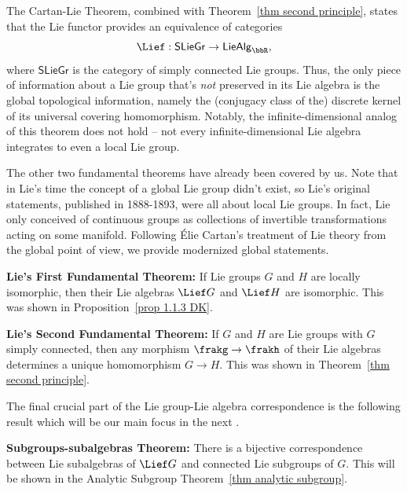 \begin{rem}
    The Cartan-Lie Theorem, combined with Theorem~\ref{thm second principle}, states that the Lie functor provides an equivalence of categories
    \[\Lief:\mathsf{SLieGr}\to \mathsf{LieAlg}_\bbR,\]
    where $\mathsf{SLieGr}$ is the category of simply connected Lie groups. Thus, the only piece of information about a Lie group that's \emph{not} preserved in its Lie algebra is the global topological information, namely the (conjugacy class of the) discrete kernel of its universal covering homomorphism. Notably, the infinite-dimensional analog of this theorem does not hold -- not every infinite-dimensional Lie algebra integrates to even a local Lie group.

    The other two fundamental theorems have already been covered by us. Note that in Lie's time the concept of a global Lie group didn't exist, so Lie's original statements, published in 1888-1893, were all about local Lie groups. In fact, Lie only conceived of continuous groups as collections of invertible transformations acting on some manifold. Following \'Elie Cartan's treatment of Lie theory from the global point of view, we provide modernized global statements.

    \textbf{Lie's First Fundamental Theorem:} If Lie groups $G$ and $H$ are locally isomorphic, then their Lie algebras $\Lief G$ and $\Lief H$ are isomorphic. This was shown in Proposition~\ref{prop 1.1.3 DK}.

    \textbf{Lie's Second Fundamental Theorem:} If $G$ and $H$ are Lie groups with $G$ simply connected, then any morphism $\frakg\to\frakh$ of their Lie algebras determines a unique homomorphism $G\to H$. This was shown in Theorem~\ref{thm second principle}.
    
    The final crucial part of the Lie group-Lie algebra correspondence is the following result which will be our main focus in the next \sect.

    \textbf{Subgroups-subalgebras Theorem:} There is a bijective correspondence between Lie subalgebras of $\Lief G$ and connected Lie subgroups of $G$. This will be shown in the Analytic Subgroup Theorem~\ref{thm analytic subgroup}.
\end{rem}


